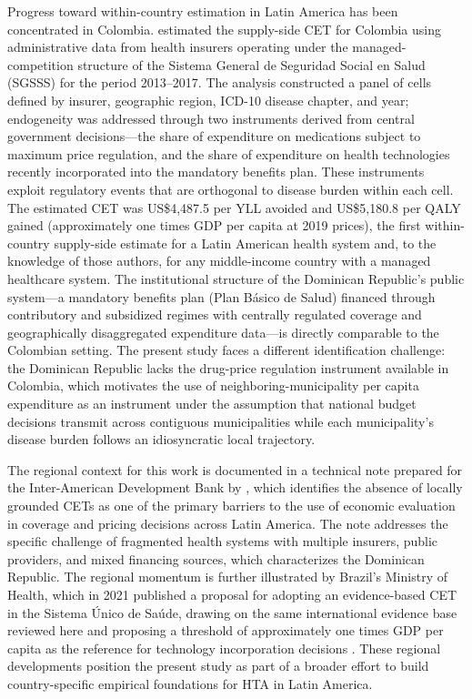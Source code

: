 \documentclass[11pt]{article}
\numberwithin{equation}{section}
\theoremstyle{remark}
\begin{document}
Progress toward within-country estimation in Latin America has been concentrated in Colombia. \citet{Espinosa2021} estimated the supply-side CET for Colombia using administrative data from health insurers operating under the managed-competition structure of the Sistema General de Seguridad Social en Salud (SGSSS) for the period 2013--2017. The analysis constructed a panel of cells defined by insurer, geographic region, ICD-10 disease chapter, and year; endogeneity was addressed through two instruments derived from central government decisions---the share of expenditure on medications subject to maximum price regulation, and the share of expenditure on health technologies recently incorporated into the mandatory benefits plan. These instruments exploit regulatory events that are orthogonal to disease burden within each cell. The estimated CET was US\$4,487.5 per YLL avoided and US\$5,180.8 per QALY gained (approximately one times GDP per capita at 2019 prices), the first within-country supply-side estimate for a Latin American health system and, to the knowledge of those authors, for any middle-income country with a managed healthcare system. The institutional structure of the Dominican Republic's public system---a mandatory benefits plan (Plan Básico de Salud) financed through contributory and subsidized regimes with centrally regulated coverage and geographically disaggregated expenditure data---is directly comparable to the Colombian setting. The present study faces a different identification challenge: the Dominican Republic lacks the drug-price regulation instrument available in Colombia, which motivates the use of neighboring-municipality per capita expenditure as an instrument under the assumption that national budget decisions transmit across contiguous municipalities while each municipality's disease burden follows an idiosyncratic local trajectory.

The regional context for this work is documented in a technical note prepared for the Inter-American Development Bank by \citet{PichonRiviere2021}, which identifies the absence of locally grounded CETs as one of the primary barriers to the use of economic evaluation in coverage and pricing decisions across Latin America. The note addresses the specific challenge of fragmented health systems with multiple insurers, public providers, and mixed financing sources, which characterizes the Dominican Republic. The regional momentum is further illustrated by Brazil's Ministry of Health, which in 2021 published a proposal for adopting an evidence-based CET in the Sistema Único de Saúde, drawing on the same international evidence base reviewed here and proposing a threshold of approximately one times GDP per capita as the reference for technology incorporation decisions \parencite{Brazil2021}. These regional developments position the present study as part of a broader effort to build country-specific empirical foundations for HTA in Latin America.
\end{document}
